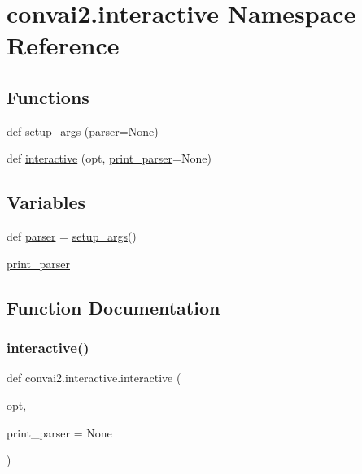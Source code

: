 \hypertarget{namespaceconvai2_1_1interactive}{}\section{convai2.\+interactive Namespace Reference}
\label{namespaceconvai2_1_1interactive}
\subsection*{Functions}
\begin{DoxyCompactItemize}
\item 
def \hyperlink{namespaceconvai2_1_1interactive_a67e317db1e41e25d73827a1dd68ff78a}{setup\+\_\+args} (\hyperlink{namespaceconvai2_1_1interactive_a5c8eb6044e72ecf82ce6cc44554c08e5}{parser}=None)
\item 
def \hyperlink{namespaceconvai2_1_1interactive_a47ad778728ed55d570bc4b8dd426e884}{interactive} (opt, \hyperlink{namespaceconvai2_1_1interactive_a46025f3575b0196a73e0f3fa699f3cf2}{print\+\_\+parser}=None)
\end{DoxyCompactItemize}
\subsection*{Variables}
\begin{DoxyCompactItemize}
\item 
def \hyperlink{namespaceconvai2_1_1interactive_a5c8eb6044e72ecf82ce6cc44554c08e5}{parser} = \hyperlink{namespaceconvai2_1_1interactive_a67e317db1e41e25d73827a1dd68ff78a}{setup\+\_\+args}()
\item 
\hyperlink{namespaceconvai2_1_1interactive_a46025f3575b0196a73e0f3fa699f3cf2}{print\+\_\+parser}
\end{DoxyCompactItemize}


\subsection{Function Documentation}
\mbox{\label{namespaceconvai2_1_1interactive_a47ad778728ed55d570bc4b8dd426e884}} 
\subsubsection{\texorpdfstring{interactive()}{interactive()}}
{\footnotesize\ttfamily def convai2.\+interactive.\+interactive (\begin{DoxyParamCaption}\item[{}]{opt,  }\item[{}]{print\+\_\+parser = {\ttfamily None} }\end{DoxyParamCaption})}



